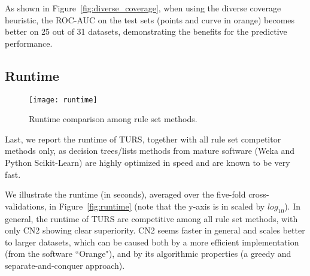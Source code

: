 As shown in Figure~\ref{fig:diverse_coverage}, when using the diverse coverage heuristic, the ROC-AUC on the test sets (points and curve in orange) becomes better on 25 out of 31 datasets, demonstrating the benefits for the predictive performance. 

\subsection{Runtime}
\begin{figure}[ht] \label{fig:runtime}
	\texttt{[image: runtime]}
	\caption{Runtime comparison among rule set methods.}	 
	\label{fig:heatmap_modelcomplexity}
\end{figure}
Last, we report the runtime of TURS, together with all rule set competitor methods only, as decision trees/lists methods from mature software (Weka and Python Scikit-Learn) are highly optimized in speed and are known to be very fast. 

We illustrate the runtime (in seconds), averaged over the five-fold cross-validations, in Figure~\ref{fig:runtime} (note that the y-axis is in scaled by $log_{10}$). In general, the runtime of TURS are competitive among all rule set methods, with only CN2 showing clear superiority. CN2 seems faster in general and scales better to larger datasets, which can be caused both by a more efficient implementation (from the software ``Orange"), and by its algorithmic properties (a greedy and separate-and-conquer approach). 














